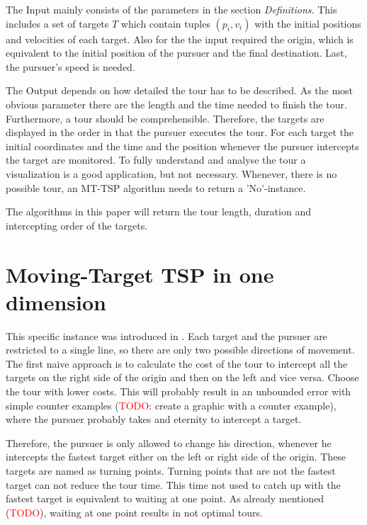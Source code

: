 \documentclass[english,version-2019-07]{uzl-thesis}
\begin{document}
The Input mainly consists of the parameters in the section \emph{Definitions}. This includes a set of targets $T$ which contain tuples $(p_i, v_i)$ with the initial positions and velocities of each target. Also for the the input required the origin, which is equivalent to the initial position of the pursuer and the final destination. Last, the pursuer's speed is needed.

The Output depends on how detailed the tour has to be described. As the most obvious parameter there are the length and the time needed to finish the tour. Furthermore, a tour should be comprehensible. Therefore, the targets are displayed in the order in that the pursuer executes the tour. For each target the initial coordinates and the time and the position whenever the pursuer intercepts the target are monitored. To fully understand and analyse the tour a visualization is a good application, but not necessary. Whenever, there is no possible tour, an MT-TSP algorithm needs to return a 'No'-instance.

The algorithms in this paper will return the tour length, duration and intercepting order of the targets.

\chapter{Moving-Target TSP in one dimension}%
\label{chapter-use}

This specific instance was introduced in \cite{helvig}. Each target and the pursuer are restricted to a single line, so there are only two possible directions of movement. The first naive approach is to calculate the cost of the tour to intercept all the targets on the right side of the origin and then on the left and vice versa. Choose the tour with lower costs. This will probably result in an unbounded error with simple counter examples (\textcolor{red}{TODO}: create a graphic with a counter example), where the pursuer probably takes and eternity to intercept a target.

Therefore, the pursuer is only allowed to change his direction, whenever he intercepts the fastest target either on the left or right side of the origin. These targets are named as turning points. Turning points that are not the fastest target can not reduce the tour time. This time not used to catch up with the fastest target is equivalent to waiting at one point. As already mentioned (\textcolor{red}{TODO}), waiting at one point results in not optimal tours. 
\end{document}
